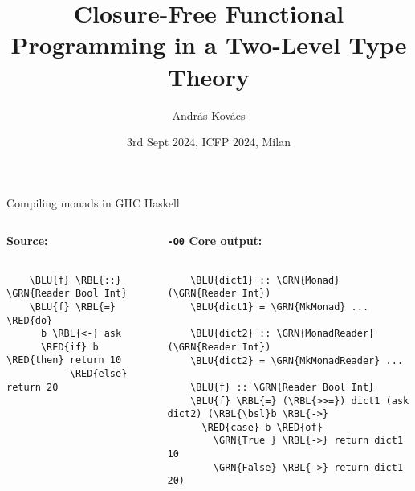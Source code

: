 \documentclass[dvipsnames,aspectratio=169]{beamer}
\title{Closure-Free Functional Programming in a Two-Level Type Theory}
\author{András Kovács}
\institute{University of Gothenburg}
\date{3rd Sept 2024, ICFP 2024, Milan}
\theoremstyle{remark}
\newcommand{\RED}[1]{{\color{BrickRed} #1}}
\newcommand{\GRN}[1]{{\color{OliveGreen} #1}}
\newcommand{\RBL}[1]{{\color{RoyalBlue} #1}}
\newcommand{\BLU}[1]{{\color{Blue} #1}}
\newcommand{\bsl}{\textbackslash}
\begin{document}
\frame{\titlepage}

\begin{frame}[fragile]{Compiling monads in GHC Haskell}

\begin{columns}
\begin{column}{0.3\textwidth}
\textbf{Source:}
\begin{Verbatim}[commandchars=\\\{\}]

    \BLU{f} \RBL{::} \GRN{Reader Bool Int}
    \BLU{f} \RBL{=} \RED{do}
      b \RBL{<-} ask
      \RED{if} b \RED{then} return 10
           \RED{else} return 20






\end{Verbatim}
\end{column}
\pause
\begin{column}{0.5\textwidth}
\textbf{\texttt{-O0} Core output:}
\begin{Verbatim}[commandchars=\\\{\}]

    \BLU{dict1} :: \GRN{Monad} (\GRN{Reader Int})
    \BLU{dict1} = \GRN{MkMonad} ...

    \BLU{dict2} :: \GRN{MonadReader} (\GRN{Reader Int})
    \BLU{dict2} = \GRN{MkMonadReader} ...

    \BLU{f} :: \GRN{Reader Bool Int}
    \BLU{f} \RBL{=} (\RBL{>>=}) dict1 (ask dict2) (\RBL{\bsl}b \RBL{->}
      \RED{case} b \RED{of}
        \GRN{True } \RBL{->} return dict1 10
        \GRN{False} \RBL{->} return dict1 20)
\end{Verbatim}
\end{column}
\end{columns}

\end{frame}

\end{document}
